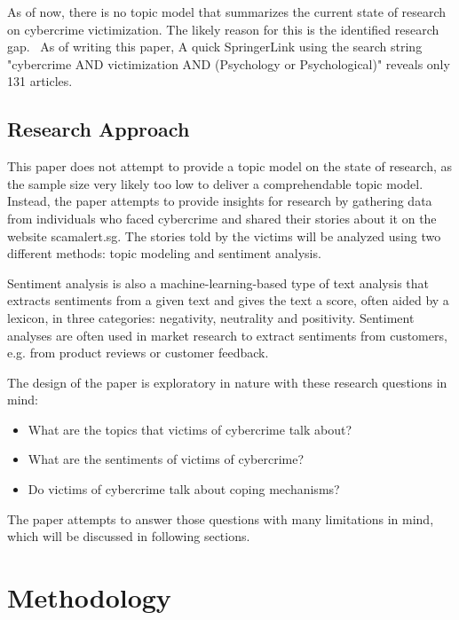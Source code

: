 \documentclass[12pt,english,titlepage,a4paper]{article}
\begin{document}
\bigskip

As of now, there is no topic model that summarizes the current state of research on cybercrime victimization. The likely reason for this is the identified research gap.~\citep{horesearch} As of writing this paper, A quick SpringerLink using the search string "cybercrime AND victimization AND (Psychology or Psychological)" reveals only 131 articles.

\subsection{Research Approach}

This paper does not attempt to provide a topic model on the state of research, as the sample size very likely too low to deliver a comprehendable topic model. 
Instead, the paper attempts to provide insights for research by gathering data from individuals who faced cybercrime and shared their stories about it on the website scamalert.sg. The stories told by the victims will be analyzed using two different methods: topic modeling and sentiment analysis.

Sentiment analysis is also a machine-learning-based type of text analysis that extracts sentiments from a given text and gives the text a score, often aided by a lexicon, in three categories: negativity, neutrality and positivity. Sentiment analyses are often used in market research to extract sentiments from customers, e.g. from product reviews or customer feedback.~\cite{rambocas2013marketing}

\bigskip

The design of the paper is exploratory in nature with these research questions in mind:

\begin{itemize}
    \item What are the topics that victims of cybercrime talk about?
    \item What are the sentiments of victims of cybercrime?
    \item Do victims of cybercrime talk about coping mechanisms?
\end{itemize}


The paper attempts to answer those questions with many limitations in mind, which will be discussed in following sections.

\pagebreak


\section{Methodology}
\end{document}
